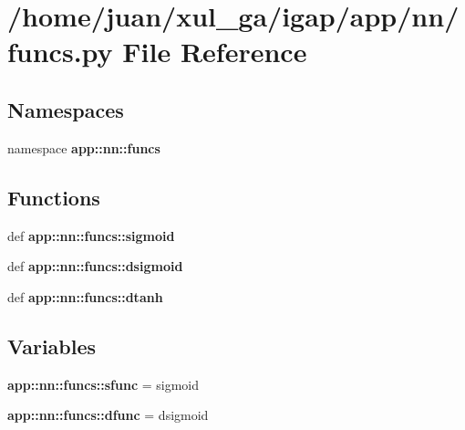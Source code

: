 \section{/home/juan/xul\_\-ga/igap/app/nn/funcs.py File Reference}
\label{funcs_8py}
\subsection*{Namespaces}
\begin{CompactItemize}
\item 
namespace {\bf app::nn::funcs}
\end{CompactItemize}
\subsection*{Functions}
\begin{CompactItemize}
\item 
def {\bf app::nn::funcs::sigmoid}
\item 
def {\bf app::nn::funcs::dsigmoid}
\item 
def {\bf app::nn::funcs::dtanh}
\end{CompactItemize}
\subsection*{Variables}
\begin{CompactItemize}
\item 
{\bf app::nn::funcs::sfunc} = sigmoid
\item 
{\bf app::nn::funcs::dfunc} = dsigmoid
\end{CompactItemize}
